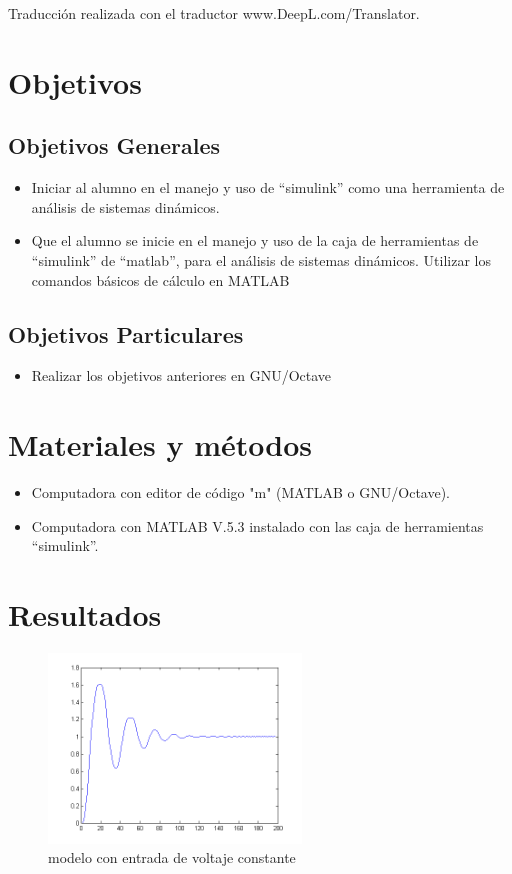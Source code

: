 \documentclass[]{article}
\begin{document}
Traducción realizada con el traductor www.DeepL.com/Translator.\cite{Deepl}

\section{Objetivos}

\subsection{Objetivos Generales}

	\begin{itemize}
		\item Iniciar al alumno en el manejo y uso de “simulink” como una herramienta de análisis de sistemas dinámicos.
		\item Que el alumno se inicie en el manejo y uso de la caja de herramientas de “simulink” de “matlab”, para el análisis de sistemas dinámicos. Utilizar los comandos básicos de cálculo en MATLAB
		
	\end{itemize}

\subsection{Objetivos Particulares}

	\begin{itemize}
		\item Realizar los objetivos anteriores en GNU/Octave
	\end{itemize}

\section{Materiales y métodos}

	\begin{itemize}
		\item Computadora con editor de código "m" (MATLAB o GNU/Octave).
		\item Computadora con MATLAB V.5.3 instalado con las caja de herramientas “simulink”.
	\end{itemize}
	
\section{Resultados}

\begin{figure}[h!]
	\centering
	\includegraphics[width=0.6\textwidth]{modeloConst.png}
	\caption{modelo con entrada de voltaje constante}
	\label{fig:modeloConst}
\end{figure}
\end{document}
